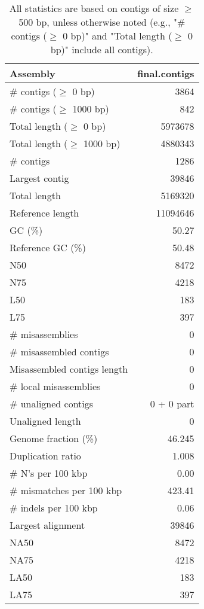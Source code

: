 \documentclass[12pt,a4paper]{article}
\begin{document}
\begin{table}[ht]
\begin{center}
\caption{All statistics are based on contigs of size $\geq$ 500 bp, unless otherwise noted (e.g., "\# contigs ($\geq$ 0 bp)" and "Total length ($\geq$ 0 bp)" include all contigs).}
\begin{tabular}{|l*{1}{|r}|}
\hline
Assembly & final.contigs \\ \hline
\# contigs ($\geq$ 0 bp) & 3864 \\ \hline
\# contigs ($\geq$ 1000 bp) & 842 \\ \hline
Total length ($\geq$ 0 bp) & 5973678 \\ \hline
Total length ($\geq$ 1000 bp) & 4880343 \\ \hline
\# contigs & 1286 \\ \hline
Largest contig & 39846 \\ \hline
Total length & 5169320 \\ \hline
Reference length & 11094646 \\ \hline
GC (\%) & 50.27 \\ \hline
Reference GC (\%) & 50.48 \\ \hline
N50 & 8472 \\ \hline
N75 & 4218 \\ \hline
L50 & 183 \\ \hline
L75 & 397 \\ \hline
\# misassemblies & 0 \\ \hline
\# misassembled contigs & 0 \\ \hline
Misassembled contigs length & 0 \\ \hline
\# local misassemblies & 0 \\ \hline
\# unaligned contigs & 0 + 0 part \\ \hline
Unaligned length & 0 \\ \hline
Genome fraction (\%) & 46.245 \\ \hline
Duplication ratio & 1.008 \\ \hline
\# N's per 100 kbp & 0.00 \\ \hline
\# mismatches per 100 kbp & 423.41 \\ \hline
\# indels per 100 kbp & 0.06 \\ \hline
Largest alignment & 39846 \\ \hline
NA50 & 8472 \\ \hline
NA75 & 4218 \\ \hline
LA50 & 183 \\ \hline
LA75 & 397 \\ \hline
\end{tabular}
\end{center}
\end{table}
\end{document}
